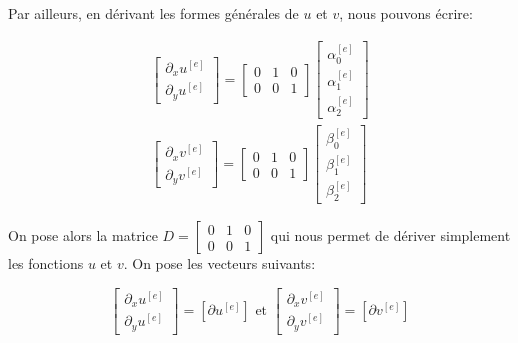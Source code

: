 \documentclass{article}
\begin{document}
Par ailleurs, en dérivant les formes générales
de $u$ et $v$, nous pouvons écrire:

\begin{align}
    \begin{bmatrix}
    \partial_x u^{[e]} \\ \partial_y u^{[e]}
    \end{bmatrix}
    =
    \begin{bmatrix}
    0 & 1 & 0 \\
    0 & 0 & 1
    \end{bmatrix}
    \begin{bmatrix}
    \alpha_0^{[e]} \\ \alpha_1^{[e]} \\ \alpha_2^{[e]}
    \end{bmatrix} \\
    \begin{bmatrix}
    \partial_x v^{[e]} \\ \partial_y v^{[e]}
    \end{bmatrix}
    =
    \begin{bmatrix}
    0 & 1 & 0 \\
    0 & 0 & 1
    \end{bmatrix}
    \begin{bmatrix}
    \beta_0^{[e]} \\ \beta_1^{[e]} \\ \beta_2^{[e]}
    \end{bmatrix}
\end{align}

On pose alors la matrice $D =
\begin{bmatrix}
    0 & 1 & 0 \\
    0 & 0 & 1
\end{bmatrix} $
qui nous permet de dériver simplement les fonctions $u$ et $v$.
On pose les vecteurs suivants:

\begin{equation}
    \begin{bmatrix}
        \partial_x u^{[e]} \\ \partial_y u^{[e]}
    \end{bmatrix}
    =
    \left[ \partial u^{[e]} \right]
    \text{ et }
    \begin{bmatrix}
        \partial_x v^{[e]} \\ \partial_y v^{[e]}
    \end{bmatrix}
    =
    \left[ \partial v^{[e]} \right]
\end{equation}
\end{document}
